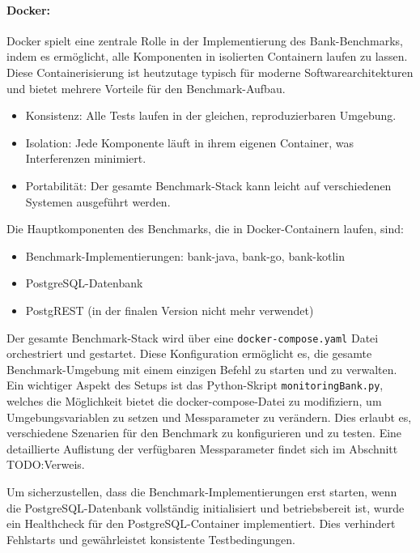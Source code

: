 \documentclass[fontsize=12pt,paper=a4,twoside=semi,parskip=half-,headsepline,headinclude]{scrreprt}
\begin{document}
\paragraph{Docker:}

Docker spielt eine zentrale Rolle in der Implementierung des Bank-Benchmarks, indem es ermöglicht, alle Komponenten in isolierten Containern laufen zu lassen. Diese Containerisierung ist heutzutage typisch für moderne Softwarearchitekturen und bietet mehrere Vorteile für den Benchmark-Aufbau.

\begin{itemize}
	\item Konsistenz: Alle Tests laufen in der gleichen, reproduzierbaren Umgebung.
	\item Isolation: Jede Komponente läuft in ihrem eigenen Container, was Interferenzen minimiert.
	\item Portabilität: Der gesamte Benchmark-Stack kann leicht auf verschiedenen Systemen ausgeführt werden.
\end{itemize}

Die Hauptkomponenten des Benchmarks, die in Docker-Containern laufen, sind:

\begin{itemize}
	\item Benchmark-Implementierungen: bank-java, bank-go, bank-kotlin
	\item PostgreSQL-Datenbank
	\item PostgREST (in der finalen Version nicht mehr verwendet)
\end{itemize}

Der gesamte Benchmark-Stack wird über eine \texttt{docker-compose.yaml} Datei orchestriert und gestartet. Diese Konfiguration ermöglicht es, die gesamte Benchmark-Umgebung mit einem einzigen Befehl zu starten und zu verwalten.
Ein wichtiger Aspekt des Setups ist das Python-Skript \texttt{monitoringBank.py}, welches die Möglichkeit bietet die docker-compose-Datei zu modifiziern, um Umgebungsvariablen zu setzen und Messparameter zu verändern. Dies erlaubt es, verschiedene Szenarien für den Benchmark zu konfigurieren und zu testen. Eine detaillierte Auflistung der verfügbaren Messparameter findet sich im Abschnitt TODO:Verweis.

Um sicherzustellen, dass die Benchmark-Implementierungen erst starten, wenn die Post\-greSQL-Datenbank vollständig initialisiert und betriebsbereit ist, wurde ein Healthcheck für den PostgreSQL-Container implementiert. Dies verhindert Fehlstarts und gewährleistet konsistente Testbedingungen.
\end{document}
